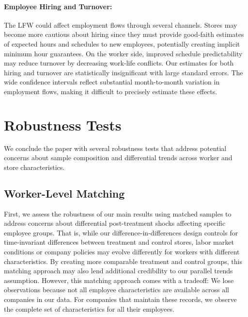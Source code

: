 \documentclass[letterpaper,11pt,leqno]{article}
\theoremstyle{paper}
\begin{document}
\paragraph{Employee Hiring and Turnover:} The LFW could affect employment flows through several channels. Stores may become more cautious about hiring since they must provide good-faith estimates of expected hours and schedules to new employees, potentially creating implicit minimum hour guarantees. On the worker side, improved schedule predictability may reduce turnover by decreasing work-life conflicts. Our estimates for both hiring and turnover are statistically insignificant with large standard errors. The wide confidence intervals reflect substantial month-to-month variation in employment flows, making it difficult to precisely estimate these effects. 




\section{Robustness Tests} \label{sec:robustness_tests}

We conclude the paper with several robustness tests that address potential concerns about sample composition and differential trends across worker and store characteristics.

\subsection{Worker-Level Matching}

First, we assess the robustness of our main results using matched samples to address concerns about differential post-treatment shocks affecting specific employee groups. That is, while our difference-in-differences design controls for time-invariant differences between treatment and control stores, labor market conditions or company policies may evolve differently for workers with different characteristics. By creating more comparable treatment and control groups, this matching approach may also lend additional credibility to our parallel trends assumption.   However, this matching approach comes with a tradeoff: We lose observations because not all employee characteristics are available across all companies in our data. For companies that maintain these records, we observe the complete set of characteristics for all their employees.
\end{document}
